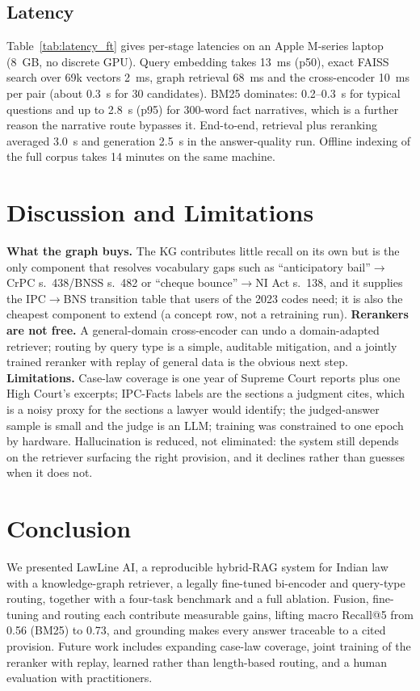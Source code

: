 \documentclass[conference]{IEEEtran}
\newcommand{\sys}{LawLine AI}
\begin{document}
\subsection{Latency}

Table~\ref{tab:latency_ft} gives per-stage latencies on an Apple M-series laptop (8~GB, no discrete GPU). Query embedding takes 13~ms (p50), exact FAISS search over 69k vectors 2~ms, graph retrieval 68~ms and the cross-encoder 10~ms per pair (about 0.3~s for 30 candidates). BM25 dominates: 0.2--0.3~s for typical questions and up to 2.8~s (p95) for 300-word fact narratives, which is a further reason the narrative route bypasses it. End-to-end, retrieval plus reranking averaged 3.0~s and generation 2.5~s in the answer-quality run. Offline indexing of the full corpus takes 14 minutes on the same machine.

\section{Discussion and Limitations}
\textbf{What the graph buys.} The KG contributes little recall on its own but is the only component that resolves vocabulary gaps such as ``anticipatory bail''$\rightarrow$CrPC s.~438/BNSS s.~482 or ``cheque bounce''$\rightarrow$NI Act s.~138, and it supplies the IPC$\rightarrow$BNS transition table that users of the 2023 codes need; it is also the cheapest component to extend (a concept row, not a retraining run).
\textbf{Rerankers are not free.} A general-domain cross-encoder can undo a domain-adapted retriever; routing by query type is a simple, auditable mitigation, and a jointly trained reranker with replay of general data is the obvious next step.
\textbf{Limitations.} Case-law coverage is one year of Supreme Court reports plus one High Court's excerpts; IPC-Facts labels are the sections a judgment cites, which is a noisy proxy for the sections a lawyer would identify; the judged-answer sample is small and the judge is an LLM; training was constrained to one epoch by hardware. Hallucination is reduced, not eliminated: the system still depends on the retriever surfacing the right provision, and it declines rather than guesses when it does not.

\section{Conclusion}
We presented \sys, a reproducible hybrid-RAG system for Indian law with a knowledge-graph retriever, a legally fine-tuned bi-encoder and query-type routing, together with a four-task benchmark and a full ablation. Fusion, fine-tuning and routing each contribute measurable gains, lifting macro Recall@5 from 0.56 (BM25) to 0.73, and grounding makes every answer traceable to a cited provision. Future work includes expanding case-law coverage, joint training of the reranker with replay, learned rather than length-based routing, and a human evaluation with practitioners.
\end{document}
